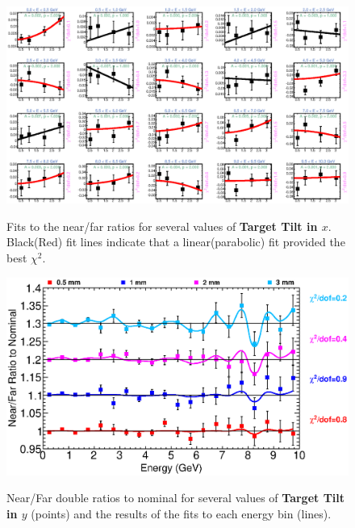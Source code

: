 \begin{figure}[ht]
  \begin{center}
    {\includegraphics[width=5.0in]{figures/TargetXTilt_nof_fits.eps}}
  \end{center}
\caption{ Fits to the near/far ratios for several values of {\bf Target Tilt in $x$}. Black(Red) fit lines indicate that a linear(parabolic) fit provided the best $\chi^2$. }
\end{figure}

\clearpage

\begin{figure}[ht]
  \begin{center}
    {\includegraphics[width=6.0in]{figures/TargetYTilt_nof_summary.eps}}
  \end{center}
\caption{ Near/Far double ratios to nominal for several values of {\bf Target Tilt in $y$} (points) and the results of the fits to each energy bin (lines).}
\end{figure}

